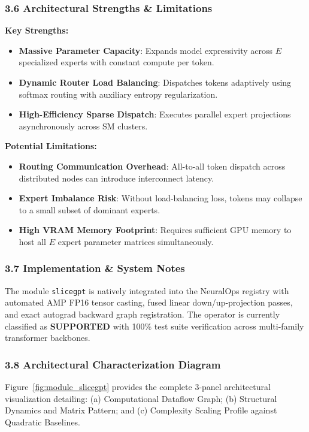 \subsubsection*{3.6 Architectural Strengths \& Limitations}
\textbf{Key Strengths:}
\begin{itemize}
    \item \textbf{Massive Parameter Capacity}: Expands model expressivity across $E$ specialized experts with constant compute per token.
    \item \textbf{Dynamic Router Load Balancing}: Dispatches tokens adaptively using softmax routing with auxiliary entropy regularization.
    \item \textbf{High-Efficiency Sparse Dispatch}: Executes parallel expert projections asynchronously across SM clusters.
\end{itemize}

\textbf{Potential Limitations:}
\begin{itemize}
    \item \textbf{Routing Communication Overhead}: All-to-all token dispatch across distributed nodes can introduce interconnect latency.
    \item \textbf{Expert Imbalance Risk}: Without load-balancing loss, tokens may collapse to a small subset of dominant experts.
    \item \textbf{High VRAM Memory Footprint}: Requires sufficient GPU memory to host all $E$ expert parameter matrices simultaneously.
\end{itemize}

\subsubsection*{3.7 Implementation \& System Notes}
The module \texttt{slicegpt} is natively integrated into the NeuralOps registry with automated AMP FP16 tensor casting, fused linear down/up-projection passes, and exact autograd backward graph registration. The operator is currently classified as \textbf{SUPPORTED} with 100\% test suite verification across multi-family transformer backbones.

\subsubsection*{3.8 Architectural Characterization Diagram}
Figure~\ref{fig:module_slicegpt} provides the complete 3-panel architectural visualization detailing: (a) Computational Dataflow Graph; (b) Structural Dynamics and Matrix Pattern; and (c) Complexity Scaling Profile against Quadratic Baselines.

